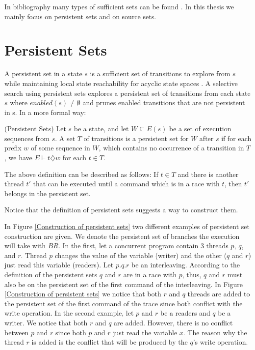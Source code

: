 In bibliography many types of sufficient sets can be found \cite{Godefroid1996}. 
In this thesis we mainly focus on persistent sets and on source sets.


\section{Persistent Sets}

A persistent set in a state $s$ is a sufficient set of transitions to
explore from $s$ while maintaining local state reachability for acyclic state spaces \cite{God97}. A selective search using persistent
sets explores a persistent set of transitions from each state $s$ where $enabled(s) \neq \emptyset$ and prunes enabled transitions that
are not persistent in s.
In a more formal way:\\

\begin{definition}{(Persistent Sets)}
Let $s$ be a state, and let $W \subseteq E(s)$ be a set
of execution sequences from $s$. A set $T$ of transitions is a persistent set for $W$
after $s$ if for each prefix $w$ of some sequence in $W$, which contains no occurrence
of a transition in $T$,  we have $E \vdash t \diamondsuit w$ for each $t \in T$.
\end{definition}

The above definition can be described as follows: If $t \in T$ and there is another thread $t'$ that can be executed until a command which
is in a race with $t$, then $t'$ belongs in the persistent set.

Notice that the definition of persistent sets suggests a way to construct them.

In Figure \ref{Construction of persistent sets} two different examples of persistent set construction are given. We denote the persistent set of branches the execution will take with $BR{}$.
In the first, let a concurrent program contain 3 threads $p$, $q$, and $r$. Thread $p$ changes the value of the variable (writer) and the other ($q$ and $r$) just read this variable (readers).
Let $p.q.r$ be an interleaving. According to the definition of the persistent sets $q$ and $r$ are in a race with $p$, thus, $q$ and $r$ must also be on the persistent set
of the first command of the interleaving. In Figure \ref{Construction of persistent sets} we notice that both $r$ and $q$ threads are added to the persistent set of the first
command of the trace since both conflict with the write operation. 
In the second example, let $p$ and $r$  be a readers and $q$ be a writer. We notice that both $r$ and $q$ are added. However, there is no conflict between $p$ and $r$ since both $p$ and $r$
just read the variable $x$. The reason why the thread $r$ is added is the conflict that will be produced by the $q$'s write operation.


